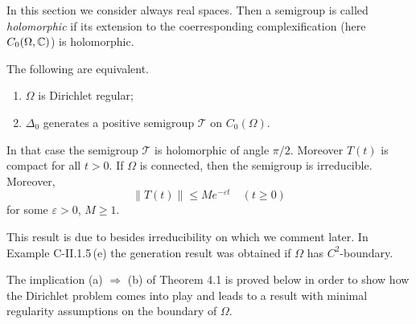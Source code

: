 In this section we consider always real spaces.
Then a semigroup is called \emph{holomorphic} if its extension to the coerresponding complexification (here $ C_{0}( \Omega, \mathbb{C} ) $) is holomorphic.
\begin{theorem}\label{thm:eb2-4.1} %
The following are equivalent.
\begin{enumerate}[\upshape (a)]

\item 
$\Omega$ is Dirichlet regular;

\item  
$\Delta_{0}$ generates a positive semigroup $\mathcal{T}$ on $C_{0}(\Omega)$.

\end{enumerate}
In that case the semigroup $\mathcal{T}$ is holomorphic of angle $\pi/2$. 
Moreover $T(t)$ is compact for all $t > 0$.
If $\Omega$ is connected, then the semigroup is irreducible. 
Moreover,
\begin{equation*}\label{eq:en-4.1}
	\|T(t)\| \leq Me^{-\varepsilon t} \quad (t \geq 0)
\end{equation*}
for some $\varepsilon > 0$, $M \geq 1$.
\end{theorem}
This result is due to \citet{ArBe99} besides irreducibility on which we comment later.
In Example C-II.1.5\,(e) the generation result was obtained if $\Omega$ has $C^{2}$-boundary.

The implication (a) $\Rightarrow$ (b) of Theorem 4.1 is proved below in order to show how the Dirichlet problem comes into play and leads to a result with minimal regularity assumptions on the boundary of $\Omega$.

